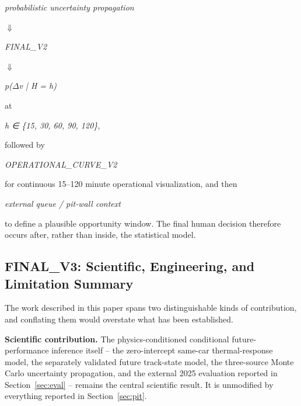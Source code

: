 \begin{center}\textit{probabilistic uncertainty propagation}\end{center}

\begin{center}\textit{\ensuremath{\Downarrow}}\end{center}

\begin{center}\textit{FINAL\_V2}\end{center}

\begin{center}\textit{\ensuremath{\Downarrow}}\end{center}

\begin{center}\textit{p(\ensuremath{\Delta}v | H = h)}\end{center}

at

\begin{center}\textit{h ∈ \{15, 30, 60, 90, 120\},}\end{center}

followed by

\begin{center}\textit{OPERATIONAL\_CURVE\_V2}\end{center}

for continuous 15--120 minute operational visualization, and then

\begin{center}\textit{external queue / pit-wall context}\end{center}

to define a plausible opportunity window. The final human decision therefore occurs after, rather than inside, the statistical model.

\subsection{FINAL\_V3: Scientific, Engineering, and Limitation Summary}
The work described in this paper spans two distinguishable kinds of contribution, and conflating them would
overstate what has been established.

\textbf{Scientific contribution.} The physics-conditioned conditional future-performance inference itself --
the zero-intercept same-car thermal-response model, the separately validated future track-state model, the
three-source Monte Carlo uncertainty propagation, and the external 2025 evaluation reported in
Section~\ref{sec:eval} -- remains the central scientific result. It is unmodified by everything reported in
Section~\ref{sec:pit}.

